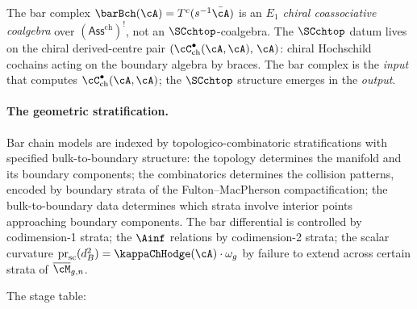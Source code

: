 The bar complex $\barBch(\cA) = T^c(s^{-1}\bar\cA)$ is an
\emph{$E_1$ chiral coassociative coalgebra} over
$(\mathsf{Ass}^{\mathrm{ch}})^!$, not an $\SCchtop$-coalgebra.
The $\SCchtop$ datum lives on the chiral
derived-centre pair
$(\cC^\bullet_{\mathrm{ch}}(\cA,\cA),\,\cA)$: chiral Hochschild
cochains acting on the boundary algebra by braces. The bar
complex is the \emph{input} that computes
$\cC^\bullet_{\mathrm{ch}}(\cA,\cA)$; the $\SCchtop$ structure
emerges in the \emph{output}.

\paragraph{The geometric stratification.}
Bar chain models are indexed by topologico-combinatoric
stratifications with specified bulk-to-boundary structure: the
topology determines the manifold and its boundary components;
the combinatorics determines the collision patterns, encoded by
boundary strata of the Fulton--MacPherson compactification; the
	bulk-to-boundary data determines which strata involve interior
	points approaching boundary components. The bar differential is
	controlled by codimension-1 strata; the $\Ainf$ relations by
	codimension-2 strata; the scalar curvature
	$\operatorname{pr}_{\mathrm{sc}}(d_B^2) = \kappaChHodge(\cA)\cdot\omega_g$ by failure to
extend across certain strata of $\overline{\cM}_{g,n}$.

The stage table:

